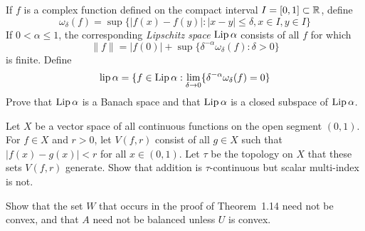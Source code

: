 \begin{enumerate}
\begin{excopy}
\end{excopy}

\begin{excopy}
If $f$ is a complex  function defined on the compact interval 
\(I=[0,1]\subset \mathbb{R}\), define
\begin{equation*}
 \omega_\delta(f) = \sup \{|f(x) - f(y)|: |x-y|\leq \delta, x\in I, y\in I\}
\end{equation*}
If \(0<\alpha \leq 1\), the corresponding 
\emph{Lipschitz space} \(\mathop{\rm Lip}\nolimits \alpha\) consists of all $f$ for which
\begin{equation*}
 \|f\| = |f(0)| + \sup\{\delta^{-\alpha} \omega_\delta(f): \delta > 0\}
\end{equation*}
is finite. Define
\begin{equation*}
 \mathop{\rm lip}\nolimits \alpha = \{f\in \mathop{\rm Lip}\nolimits \alpha: 
           \lim_{\delta\rightarrow 0} \{\delta^{-\alpha} \omega_\delta(f) = 0\}
\end{equation*}
Prove that \(\mathop{\rm Lip}\nolimits \alpha\) is a 
Banach space and that \(\mathop{\rm Lip}\nolimits \alpha\) is a closed subspace of \(\mathop{\rm Lip}\nolimits \alpha\).
\end{excopy}

\begin{excopy}
Let $X$ be a vector space of all continuous functions on the open segment
\((0,1)\). For 
\(f\in X\) and \(r>0\), let \(V(f,r)\) consist of all \(g\in X\) such that
\(|f(x)-g(x)|<r\) for all \(x\in(0,1)\).
Let \(\tau\) be the topology on $X$ that these sets \(V(f,r)\) generate.
Show that addition is \(\tau\)-continuous but scalar multi-index is not.
\end{excopy}

\begin{excopy}
Show that the set $W$ that occurs in the proof of Theorem~1.14 need
not be convex, and that $A$ need not be balanced unless $U$ is convex.
\end{excopy}

\end{enumerate}



\chapterTypeout{}


% 



